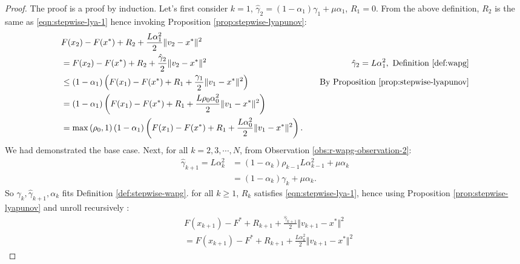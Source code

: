 \documentclass[12pt]{article}
\begin{document}
    \begin{proof}  
        The proof is a proof by induction. 
        Let's first consider $k = 1$, $\hat \gamma_2 = (1 - \alpha_1)\gamma_1 + \mu \alpha_1$, $R_1 = 0$. 
        From the above definition, $R_2$ is the same as \eqref{eqn:stepwise-lya-1} hence invoking Proposition \ref{prop:stepwise-lyapunov}: 
        \begin{align*}
            & F(x_{2}) - F(x^*) + R_2 + \frac{L \alpha_1^2}{2}\Vert v_{2} - x^*\Vert^2
            \\
            & = F(x_{2}) - F(x^*) + R_2 + \frac{\hat \gamma_{2}}{2}\Vert v_{2} - x^*\Vert^2
            & \hat \gamma_2 = L \alpha_1^2 , \text{ Definition \ref{def:wapg}}
            \\
            &\le 
            (1 - \alpha_1)\left(
                F(x_1) - F(x^*) + R_1 + \frac{\gamma_1}{2}\Vert v_1 - x^*\Vert^2
            \right) 
            & \quad \text{By Proposition \ref{prop:stepwise-lyapunov}}
            \\
            &= 
            (1 - \alpha_1)\left(
                F(x_1) - F(x^*) + R_1 + \frac{L\rho_{0}\alpha_{0}^2}{2}\Vert v_1 - x^*\Vert^2
            \right) 
            \\
            &= \max\left(\rho_0, 1\right)
            (1 - \alpha_1)\left(
                F(x_1) - F(x^*) + R_1 + \frac{L\alpha_0^2}{2}\Vert v_1 - x^*\Vert^2
            \right). 
        \end{align*}
        We had demonstrated the base case. 
        Next, for all $k = 2, 3, \cdots, N$, from Observation \ref{obs:r-wapg-observation-2}: 
        \begin{align*}
            \hat \gamma_{k + 1} = L\alpha_{k}^2 
            &=(1 - \alpha_k)\rho_{k - 1}L\alpha_{k - 1}^2 + \mu\alpha_k
            \\
            &= (1 - \alpha_k)\gamma_k + \mu\alpha_k. 
        \end{align*}
        So $\gamma_k, \hat \gamma_{k + 1}, \alpha_k$ fits Definition \ref{def:stepwise-wapg}. 
        for all $k \ge 1$, $R_k$ satisfies \eqref{eqn:stepwise-lya-1}, hence using Proposition \ref{prop:stepwise-lyapunov} and unroll recursively : 
        {\small
        \begin{align*}
            &
            F(x_{k + 1}) - F^* + R_{k + 1} + \frac{\hat\gamma_{k + 1}}{2}\Vert v_{k + 1} - x^*\Vert^2 
            \\
            &=
            F(x_{k + 1}) - F^* + R_{k + 1} + \frac{L \alpha_k^2}{2}\Vert v_{k + 1} - x^*\Vert^2

\end{align*}}
\end{proof}
\end{document}
